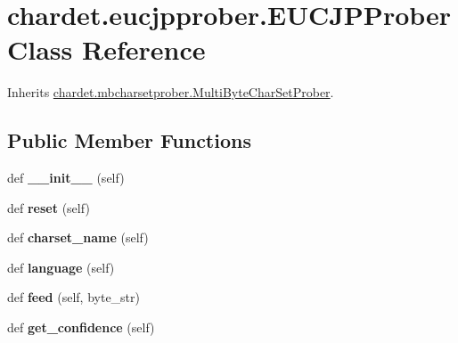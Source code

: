 \hypertarget{classchardet_1_1eucjpprober_1_1_e_u_c_j_p_prober}{}\section{chardet.\+eucjpprober.\+E\+U\+C\+J\+P\+Prober Class Reference}
\label{classchardet_1_1eucjpprober_1_1_e_u_c_j_p_prober}


Inherits \hyperlink{classchardet_1_1mbcharsetprober_1_1_multi_byte_char_set_prober}{chardet.\+mbcharsetprober.\+Multi\+Byte\+Char\+Set\+Prober}.

\subsection*{Public Member Functions}
\begin{DoxyCompactItemize}
\item 
\mbox{\label{classchardet_1_1eucjpprober_1_1_e_u_c_j_p_prober_ae8c9cd03aeb876f61468439148056ae0}} 
def {\bfseries \+\_\+\+\_\+init\+\_\+\+\_\+} (self)
\item 
\mbox{\label{classchardet_1_1eucjpprober_1_1_e_u_c_j_p_prober_a2c77bd362e51fa751e2333fc7a8d1516}} 
def {\bfseries reset} (self)
\item 
\mbox{\label{classchardet_1_1eucjpprober_1_1_e_u_c_j_p_prober_ae6f8b82261ec3ae06599226c7f2cf0a2}} 
def {\bfseries charset\+\_\+name} (self)
\item 
\mbox{\label{classchardet_1_1eucjpprober_1_1_e_u_c_j_p_prober_a4bc18e4a1af92a960dfecea10aaafeda}} 
def {\bfseries language} (self)
\item 
\mbox{\label{classchardet_1_1eucjpprober_1_1_e_u_c_j_p_prober_a6e6618acca8b4c648aee54522f0999db}} 
def {\bfseries feed} (self, byte\+\_\+str)
\item 
\mbox{\label{classchardet_1_1eucjpprober_1_1_e_u_c_j_p_prober_a1e5a6ee55454f6c9f0af3dbb48313dae}} 
def {\bfseries get\+\_\+confidence} (self)
\end{DoxyCompactItemize}
